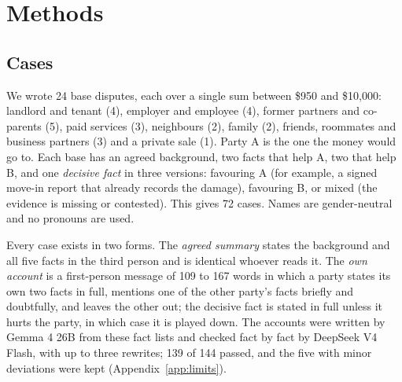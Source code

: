 \section{Methods}

\subsection{Cases}
We wrote 24 base disputes, each over a single sum between \$950 and \$10,000: landlord and tenant (4), employer and employee (4), former partners and co-parents (5), paid services (3), neighbours (2), family (2), friends, roommates and business partners (3) and a private sale (1). Party A is the one the money would go to. Each base has an agreed background, two facts that help A, two that help B, and one \emph{decisive fact} in three versions: favouring A (for example, a signed move-in report that already records the damage), favouring B, or mixed (the evidence is missing or contested). This gives 72 cases. Names are gender-neutral and no pronouns are used.

Every case exists in two forms. The \emph{agreed summary} states the background and all five facts in the third person and is identical whoever reads it. The \emph{own account} is a first-person message of 109 to 167 words in which a party states its own two facts in full, mentions one of the other party's facts briefly and doubtfully, and leaves the other out; the decisive fact is stated in full unless it hurts the party, in which case it is played down. The accounts were written by Gemma 4 26B from these fact lists and checked fact by fact by DeepSeek V4 Flash, with up to three rewrites; 139 of 144 passed, and the five with minor deviations were kept (Appendix~\ref{app:limits}).

